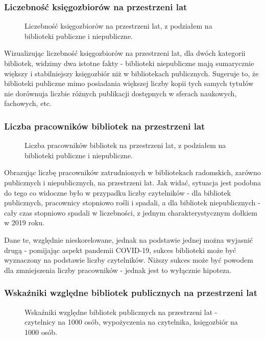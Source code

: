 \documentclass[12pt]{article}
\begin{document}
\subsubsection{Liczebność księgozbiorów na przestrzeni lat}
\begin{figure}[H]
    
    \caption{Liczebność księgozbiorów na przestrzeni lat, z podziałem na biblioteki publiczne i niepubliczne.}
\end{figure}

Wizualizując liczebność księgozbiorów na przestrzeni lat, dla dwóch kategorii bibliotek, widzimy dwa istotne fakty - 
biblioteki niepubliczne mają sumarycznie większy i stabilniejszy księgozbiór niż w bibliotekach publicznych. 
Sugeruje to, że biblioteki publiczne mimo posiadania większej liczby kopii tych samych tytułów nie dorównuja liczbie 
różnych publikacji dostępnych w sferach naukowych, fachowych, etc.  

\subsubsection{Liczba pracowników bibliotek na przestrzeni lat}
\begin{figure}[H]
    
    \caption{Liczba pracowników bibliotek na przestrzeni lat, z podziałem na biblioteki publiczne i niepubliczne.}
\end{figure}

Obrazując liczbę pracowników zatrudnionych w bibliotekach radomskich, zarówno publicznych i niepublicznych, na przestrzeni lat.
Jak widać, sytuacja jest podobna do tego co widoczne było w przypadku liczby czytelników - dla bibliotek publicznych, pracownicy 
stopniowo rośli i spadali, a dla bibliotek niepublicznych - cały czas stopniowo spadali w liczebności, z jednym charakterystycznym
dołkiem w 2019 roku. 

Dane te, względnie nieskorelowane, jednak na podstawie jednej można wyjasnić drugą - pomijając aspekt pandemii COVID-19, 
sukces biblioteki może być wyznaczony na podstawie liczby czytelników. Niższy sukces może być powodem dla zmniejszenia 
liczby pracowników - jednak jest to wyłącznie hipoteza. 

\subsubsection{Wskaźniki względne bibliotek publicznych na przestrzeni lat}
\begin{figure}[H]
    
    \caption{Wskaźniki względne bibliotek publicznych na przestrzeni lat - czytelnicy na 1000 osób, wypożyczenia na czytelnika, 
    księgozbiór na 1000 osób.}
\end{figure}
\end{document}
